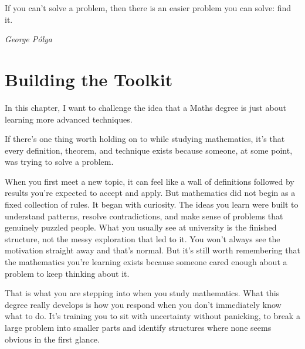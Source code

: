 \epigraph{If you can't solve a problem, then there is an easier problem you can solve: find it.}
{\textit{George Pólya}}


\section{Building the Toolkit}


In this chapter, I want to challenge the idea that a Maths degree is just about learning more advanced techniques. 

If there’s one thing worth holding on to while studying mathematics, it’s that every definition, theorem, and technique exists because someone, at some point, was trying to solve a problem.

When you first meet a new topic, it can feel like a wall of definitions followed by results you’re expected to accept and apply. But mathematics did not begin as a fixed collection of rules. It began with curiosity. The ideas you learn were built to understand patterns, resolve contradictions, and make sense of problems that genuinely puzzled people. What you usually see at university is the finished structure, not the messy exploration that led to it. You won’t always see the motivation straight away and that’s normal. But it’s still worth remembering that the mathematics you’re learning exists because someone cared enough about a problem to keep thinking about it.

That is what you are stepping into when you study mathematics. What this degree really develops is how you respond when you don’t immediately know what to do. It’s training you to sit with uncertainty without panicking, to break a large problem into smaller parts and identify structures where none seems obvious in the first glance. 



